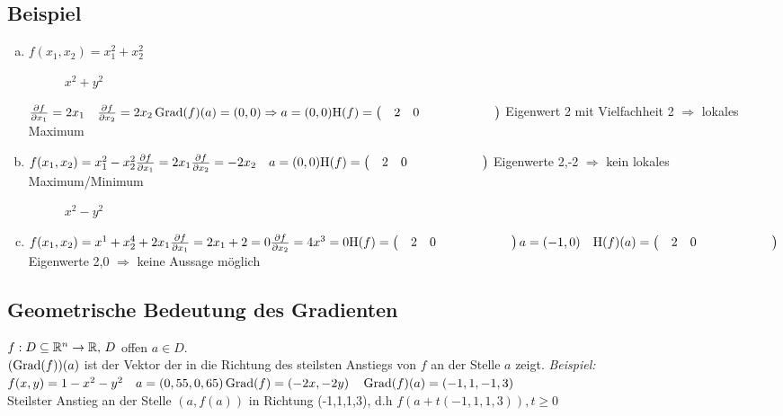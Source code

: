 \subsection{Beispiel}
\begin{enumerate}[a)]
\item $f(x_1,x_2) = x_1^2 + x_2^2$
\begin{figure}[h!]
\centering
{}
\caption{$x^2 + y^2$}
\end{figure}
$\frac{\partial f}{\partial x_1} = 2x_1\quad \frac{\partial f}{\partial x_2} = 2x_2\\
\Grad(f)(a) = (0,0) \Rightarrow a = (0,0)\\
\Hesse = \Matrix{2,0;0,2}$ Eigenwert 2 mit Vielfachheit 2 $\Rightarrow$ lokales Maximum
\item $f (x_1,x_2) = x_1^2 - x_2^2\\
\frac{\partial f}{\partial x_1} = 2x_1\\
\frac{\partial f}{\partial x_2} = -2x_2\quad a = (0,0)\\
\Hesse = \Matrix{2,0;0,-2}$ Eigenwerte 2,-2 $\Rightarrow$ kein lokales Maximum/Minimum
\begin{figure}[h!]
\centering
{}
\caption{$x^2 - y^2$}
\end{figure}
\item $f(x_1,x_2) = x^1 + x_2^4 + 2x_1\\
\frac{\partial f}{\partial x_1} = 2x_1 + 2 = 0\\
\frac{\partial f}{\partial x_2} = 4x^3 = 0 \Hesse = \Matrix{2,0;0,12x^2}\\
a = (-1,0)\quad \Hesse(a) = \Matrix{2,0;0,0}$\\
Eigenwerte 2,0 $\Rightarrow$ keine Aussage möglich
\end{enumerate}
\subsection{Geometrische Bedeutung des Gradienten}
$f : D \subseteq \mathbb{R}^n \to \mathbb{R},\,D$ offen $a \in D$.\\
$(\operatorname{Grad}(f))(a)$ ist der Vektor der in die Richtung des steilsten Anstiegs von $f$ an der Stelle $a$ zeigt.
\emph{Beispiel:} $f(x,y) = 1 - x^2 - y^2\quad a = (0,55,0,65)\\
\operatorname{Grad}(f) = (-2x,-2y)\quad \operatorname{Grad}(f)(a) = (-1,1,-1,3)$\\
Steilster Anstieg an der Stelle $(a,f(a))$ in Richtung (-1,1,1,3), d.h $f(a+t(-1,1,1,3)),t \geq 0$
